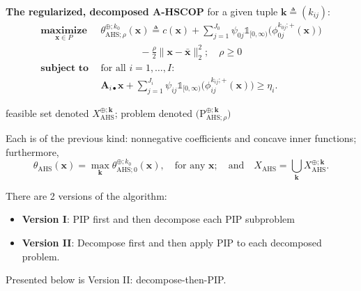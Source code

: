 \documentclass[aspectratio=169,xcolor=dvipsnames]{beamer}
\begin{document}
\begin{frame}
  \footnotesize
  \setlength{\abovedisplayskip}{3pt}
  \setlength{\belowdisplayskip}{3pt}

  \textbf{The regularized, decomposed A-HSCOP} for a given tuple
  $\mathbf{k}\triangleq(k_{ij})$:
  \[
    \begin{aligned}
      \operatorname*{\textbf{maximize}}_{\mathbf{x}\in P}\ \
      &\theta^{\oplus;k_0}_{\mathrm{AHS};\rho}(\mathbf{x})\triangleq
        c(\mathbf{x})+\sum_{j=1}^{J_0}\psi_{0j}\mathds{1}_{[0,\infty)}
        \bigl(\phi^{k_{0j};+}_{0j}(\mathbf{x})\bigr)\\
      &\qquad\qquad-\frac{\rho}{2}\|\mathbf{x}-\bar{\mathbf{x}}\|_2^2;
        \quad\rho\geq 0\\[2pt]
      \operatorname*{\textbf{subject to}}\ \ &\text{for all }i=1,\ldots,I:\\[1pt]
      &\mathbf{A}_{i\bullet}\mathbf{x}+\sum_{j=1}^{J_i}\psi_{ij}
        \mathds{1}_{[0,\infty)}\bigl(\phi^{k_{ij};+}_{ij}(\mathbf{x})\bigr)
        \geq\eta_i.
    \end{aligned}
  \]

  \vspace{0.02cm}
  feasible set denoted $X^{\oplus;\mathbf{k}}_{\mathrm{AHS}}$; problem denoted
  $\bigl(\mathrm{P}^{\oplus;\mathbf{k}}_{\mathrm{AHS};\rho}\bigr)$

  \vspace{0.06cm}
  Each is of the previous kind: nonnegative coefficients and concave inner
  functions; furthermore,
  \[
    \theta_{\mathrm{AHS}}(\mathbf{x})=\max_{\mathbf{k}}
      \theta^{\oplus;k_0}_{\mathrm{AHS};0}(\mathbf{x}),\quad
      \text{for any }\mathbf{x};\quad\text{and}\quad
      X_{\mathrm{AHS}}=\bigcup_{\mathbf{k}}X^{\oplus;\mathbf{k}}_{\mathrm{AHS}}.
  \]
\end{frame}

\begin{frame}
  \setlength{\parskip}{0pt}

  There are 2 versions of the algorithm:
  \begin{itemize}
    \setlength{\itemsep}{0.20cm}
    \item {\color{MediumBlue}\textbf{Version I}}: PIP first and then decompose
      each PIP subproblem
    \item {\color{MediumBlue}\textbf{Version II}}: Decompose first and then
      apply PIP to each decomposed problem.
  \end{itemize}

  \vspace{0.20cm}
  Presented below is Version II: decompose-then-PIP.
\end{frame}
\end{document}
